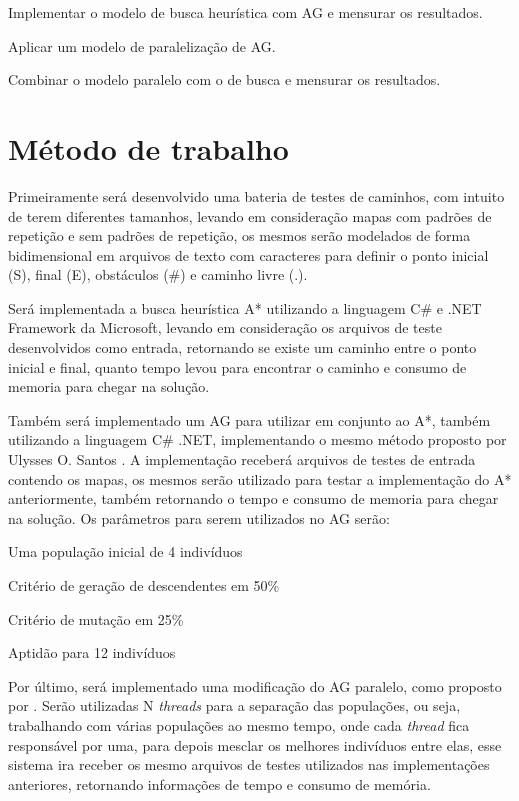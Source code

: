 Implementar o modelo de busca heurística com AG e mensurar os resultados. 

Aplicar um modelo de paralelização de AG. 

Combinar o modelo paralelo com o de busca e mensurar os resultados.

\section{Método de trabalho}

Primeiramente será desenvolvido uma bateria de testes de caminhos, com intuito de terem diferentes tamanhos, levando em consideração mapas com padrões de repetição e sem padrões de repetição, os mesmos serão modelados de forma bidimensional em arquivos de texto com caracteres para definir o ponto inicial (S), final (E), obstáculos (\#) e caminho livre (.).

Será implementada a busca heurística A* utilizando a linguagem C\# e .NET Framework da Microsoft, levando em consideração os arquivos de teste desenvolvidos como entrada, retornando se existe um caminho entre o ponto inicial e final, quanto tempo levou para encontrar o caminho e consumo de memoria para chegar na solução. 

Também será implementado um AG para utilizar em conjunto ao A*, também utilizando a linguagem C\# .NET, implementando o mesmo método proposto por Ulysses O. Santos \cite{Ulysses}. A implementação receberá  arquivos de testes de entrada contendo os mapas, os mesmos serão utilizado para testar a implementação do A* anteriormente, também retornando o tempo e consumo de memoria para chegar na solução. Os parâmetros para serem utilizados no AG serão:

Uma população inicial de 4 indivíduos

Critério de geração de descendentes em 50\%

Critério de mutação em 25\% 

Aptidão para 12 indivíduos

Por último, será implementado uma modificação do AG paralelo, como proposto por \cite{Alaoui}. Serão utilizadas N \textit{threads} para a separação das populações, ou seja, trabalhando com várias populações ao mesmo tempo, onde cada \textit{thread} fica responsável por uma, para depois mesclar os melhores indivíduos entre elas, esse sistema ira receber os mesmo arquivos de testes utilizados nas implementações anteriores, retornando informações de tempo e consumo de memória.

